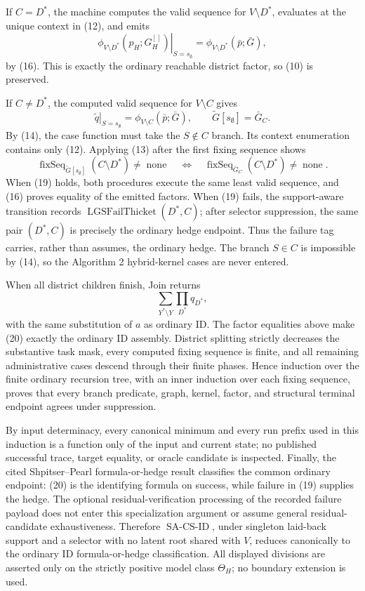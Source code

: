 If \(C=D^{*}\), the machine computes the valid sequence for \(V\setminus D^{*}\), evaluates at the unique context in (12), and emits
\[
 \left.
 \phi_{V\setminus D^{*}}(p_H;G_H^{[]})
 \right|_{S=s_{\emptyset}}
 =
 \phi_{V\setminus D^{*}}(\bar p;\bar G),
 \tag{17}
\]
by (16).  This is exactly the ordinary reachable district factor, so (10) is preserved.

If \(C\ne D^{*}\), the computed valid sequence for \(V\setminus C\) gives
\[
 \left.\widetilde q\right|_{S=s_{\emptyset}}
 =\phi_{V\setminus C}(\bar p;\bar G),
 \qquad
 \widetilde G[s_{\emptyset}]=\bar G_C.
 \tag{18}
\]
By (14), the case function must take the \(S\notin C\) branch.  Its context enumeration contains only (12).  Applying (13) after the first fixing sequence shows
\[
 \operatorname{fixSeq}_{\widetilde G[s_{\emptyset}]}(C\setminus D^{*})
 \ne\operatorname{none}
 \quad\Longleftrightarrow\quad
 \operatorname{fixSeq}_{\bar G_C}(C\setminus D^{*})
 \ne\operatorname{none}.
 \tag{19}
\]
When (19) holds, both procedures execute the same least valid sequence, and (16) proves equality of the emitted factors.  When (19) fails, the support-aware transition records \(\operatorname{LGSFailThicket}(D^{*},C)\); after selector suppression, the same pair \((D^{*},C)\) is precisely the ordinary hedge endpoint.  Thus the failure tag carries, rather than assumes, the ordinary hedge.  The branch \(S\in C\) is impossible by (14), so the Algorithm 2 hybrid-kernel cases are never entered.

When all district children finish, Join returns
\[
 \sum_{Y^{*}\setminus Y}\prod_{D^{*}}q_{D^{*}},
 \tag{20}
\]
with the same substitution of \(a\) as ordinary ID.  The factor equalities above make (20) exactly the ordinary ID assembly.  District splitting strictly decreases the substantive task mask, every computed fixing sequence is finite, and all remaining administrative cases descend through their finite phases.  Hence induction over the finite ordinary recursion tree, with an inner induction over each fixing sequence, proves that every branch predicate, graph, kernel, factor, and structural terminal endpoint agrees under suppression.

By input determinacy, every canonical minimum and every run prefix used in this induction is a function only of the input and current state; no published successful trace, target equality, or oracle candidate is inspected.  Finally, the cited Shpitser--Pearl formula-or-hedge result classifies the common ordinary endpoint: (20) is the identifying formula on success, while failure in (19) supplies the hedge.  The optional residual-verification processing of the recorded failure payload does not enter this specialization argument or assume general residual-candidate exhaustiveness.  Therefore \(\operatorname{SA\mbox{-}CS\mbox{-}ID}\), under singleton laid-back support and a selector with no latent root shared with \(V\), reduces canonically to the ordinary ID formula-or-hedge classification.  All displayed divisions are asserted only on the strictly positive model class \(\Theta_H\); no boundary extension is used.
